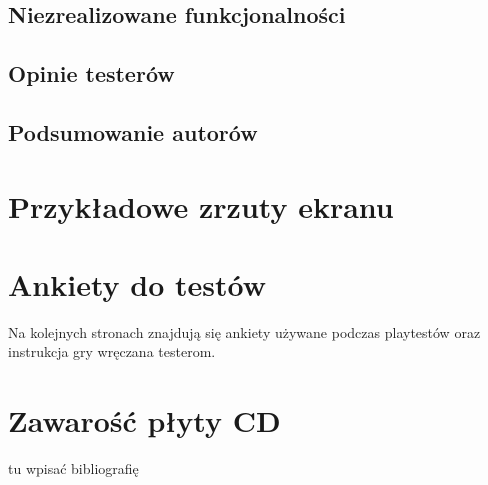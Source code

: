 \documentclass[licencjacka]{pracamgr}
\begin{document}
  \section{Niezrealizowane funkcjonalności}

  \section{Opinie testerów}

  \section{Podsumowanie autorów}

\appendix

  \chapter{Przykładowe zrzuty ekranu}

  \chapter{Ankiety do testów}
  Na kolejnych stronach znajdują się ankiety używane podczas playtestów
  oraz instrukcja gry wręczana testerom.

    
    

  \chapter{Zawarość płyty CD}


\begin{thebibliography}{99}

  \item{tu wpisać bibliografię}

\end{thebibliography}
\end{document}
